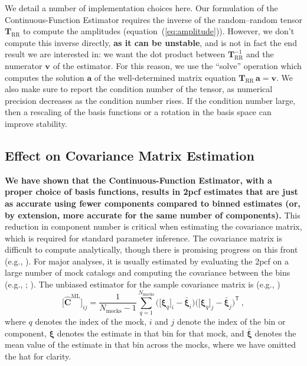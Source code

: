 \documentclass[modern]{aastex62}
\newcommand{\cf}{2pcf\xspace}
\newcommand{\est}{the Continuous-Function Estimator\xspace}
\newcommand{\eqt}[1]{equation~(\ref{#1})}
\newcommand{\inv}{^{-1}}
\newcommand{\T}{^{\mathsf{T}}}
\newcommand{\bld}[1]{\bm{#1}}
\newcommand{\vv}[1]{\bld{v}_\mathrm{#1}}
\newcommand{\TT}[1]{\bld{T}_\mathrm{#1}}
\newcommand{\NN}[1]{N_\mathrm{#1}}
\newcommand{\new}[1]{\textbf{#1}}
\begin{document}
We detail a number of implementation choices here.
Our formulation of \est requires the inverse of the random--random tensor $\TT{RR}$ to compute the amplitudes (\eqt{eq:amplitude}).
However, we don't compute this inverse directly, \new{as it can be unstable}, and is not in fact the end result we are interested in: we want the dot product between $\TT{RR}\inv$ and the numerator $\vv{}$ of the estimator.
For this reason, we use the ``solve'' operation which computes the solution $\bld{a}$ of the well-determined matrix equation $\TT{RR}\,\bld{a}=\bld{v}$.
We also make sure to report the condition number of the tensor, as numerical precision decreases as the condition number rises.
If the condition number large, then a rescaling of the basis functions or a rotation in the basis space can improve stability.

\subsection{Effect on Covariance Matrix Estimation}
\label{sec:covariance}

\new{We have shown that \est, with a proper choice of basis functions, results in \cf estimates that are just as accurate using fewer components compared to binned estimates (or, by extension, more accurate for the same number of components).}
This reduction in component number is critical when estimating the covariance matrix, which is required for standard parameter inference.
The covariance matrix is difficult to compute analytically, though there is promising progress on this front (e.g., \citealt{Wadekar2020}).
For major analyses, it is usually estimated by evaluating the \cf on a large number of mock catalogs and computing the covariance between the bins (e.g., \citealt{Reid2010}; \citealt{Anderson2014}).
The unbiased estimator for the sample covariance matrix is (e.g., \citealt{Anderson2003})
\begin{equation}
\big[ \bld{\hat{C}}^\mathrm{ML} \big]_{ij} = \frac{1}{\NN{mocks}-1} \sum_{q=1}^{\NN{mocks}} \bigg( \big[\bld{\xi}_q \big]_i - \bar{\bld{\xi}}_i \bigg) \bigg([\bld{\xi}_q \big]_j - \bar{\bld{\xi}}_j \bigg)\T ~,
\end{equation}
where $q$ denotes the index of the mock, $i$ and $j$ denote the index of the bin or component, $\bld{\xi}$ denotes the estimate in that bin for that mock, and $\bar{\bld{\xi}}$ denotes the mean value of the estimate in that bin across the mocks, where we have omitted the hat for clarity.
\end{document}
